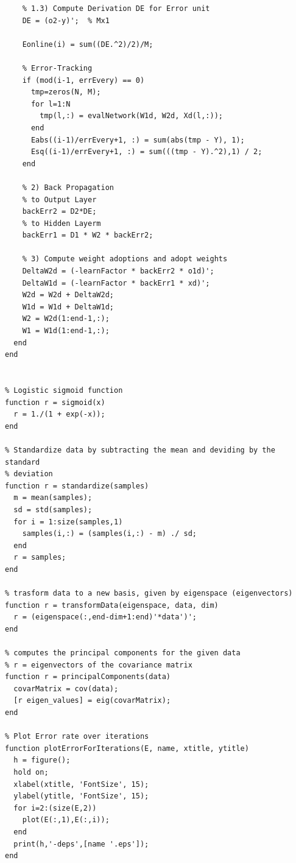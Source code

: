 \documentclass{article}
\begin{document}
\begin{lstlisting}
    % 1.3) Compute Derivation DE for Error unit
    DE = (o2-y)';  % Mx1

    Eonline(i) = sum((DE.^2)/2)/M;

    % Error-Tracking
    if (mod(i-1, errEvery) == 0)
      tmp=zeros(N, M);
      for l=1:N
        tmp(l,:) = evalNetwork(W1d, W2d, Xd(l,:));
      end
      Eabs((i-1)/errEvery+1, :) = sum(abs(tmp - Y), 1);
      Esq((i-1)/errEvery+1, :) = sum(((tmp - Y).^2),1) / 2;
    end

    % 2) Back Propagation
    % to Output Layer
    backErr2 = D2*DE;
    % to Hidden Layerm
    backErr1 = D1 * W2 * backErr2;
    
    % 3) Compute weight adoptions and adopt weights
    DeltaW2d = (-learnFactor * backErr2 * o1d)';
    DeltaW1d = (-learnFactor * backErr1 * xd)';
    W2d = W2d + DeltaW2d;
    W1d = W1d + DeltaW1d;
    W2 = W2d(1:end-1,:);
    W1 = W1d(1:end-1,:);
  end
end


% Logistic sigmoid function
function r = sigmoid(x)
  r = 1./(1 + exp(-x));
end

% Standardize data by subtracting the mean and deviding by the standard
% deviation
function r = standardize(samples)
  m = mean(samples);
  sd = std(samples);
  for i = 1:size(samples,1)
    samples(i,:) = (samples(i,:) - m) ./ sd;
  end
  r = samples;
end

% trasform data to a new basis, given by eigenspace (eigenvectors)
function r = transformData(eigenspace, data, dim)
  r = (eigenspace(:,end-dim+1:end)'*data')';
end

% computes the principal components for the given data
% r = eigenvectors of the covariance matrix
function r = principalComponents(data)
  covarMatrix = cov(data);
  [r eigen_values] = eig(covarMatrix);
end

% Plot Error rate over iterations
function plotErrorForIterations(E, name, xtitle, ytitle)
  h = figure();
  hold on;
  xlabel(xtitle, 'FontSize', 15);
  ylabel(ytitle, 'FontSize', 15);
  for i=2:(size(E,2))
    plot(E(:,1),E(:,i));
  end
  print(h,'-deps',[name '.eps']);
end

\end{lstlisting}
\end{document}
